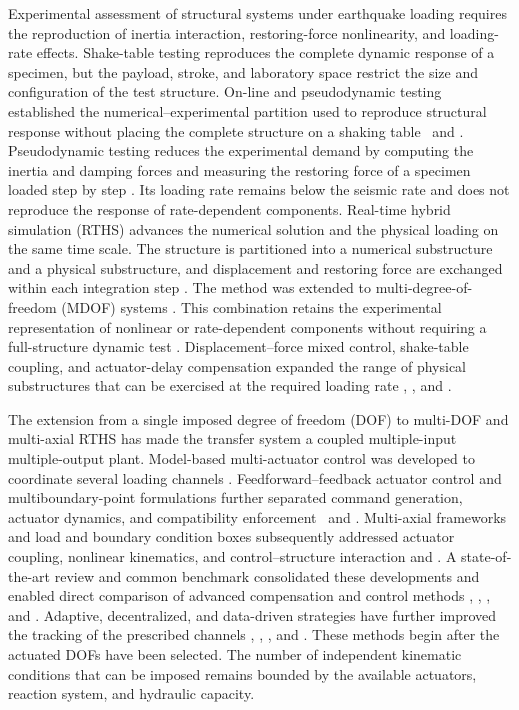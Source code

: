 \documentclass[a4paper,fleqn,review,12pt]{cas-sc}
\numberwithin{equation}{section}
\begin{document}
Experimental assessment of structural systems under earthquake loading requires the reproduction of inertia interaction, restoring-force nonlinearity, and loading-rate effects. Shake-table testing reproduces the complete dynamic response of a specimen, but the payload, stroke, and laboratory space restrict the size and configuration of the test structure. On-line and pseudodynamic testing established the numerical--experimental partition used to reproduce structural response without placing the complete structure on a shaking table \cite{Takanashi1987}\ and \cite{Mahin1989}. Pseudodynamic testing reduces the experimental demand by computing the inertia and damping forces and measuring the restoring force of a specimen loaded step by step \cite{Mahin1989}. Its loading rate remains below the seismic rate and does not reproduce the response of rate-dependent components. Real-time hybrid simulation (RTHS) advances the numerical solution and the physical loading on the same time scale. The structure is partitioned into a numerical substructure and a physical substructure, and displacement and restoring force are exchanged within each integration step \cite{Nakashima1992}. The method was extended to multi-degree-of-freedom (MDOF) systems \cite{NakashimaMasaoka1999}. This combination retains the experimental representation of nonlinear or rate-dependent components without requiring a full-structure dynamic test \cite{Gao2013}. Displacement--force mixed control, shake-table coupling, and actuator-delay compensation expanded the range of physical substructures that can be exercised at the required loading rate \cite{Pan2005}, \cite{Shao2011}, and \cite{Horiuchi1999}.

The extension from a single imposed degree of freedom (DOF) to multi-DOF and multi-axial RTHS has made the transfer system a coupled multiple-input multiple-output plant. Model-based multi-actuator control was developed to coordinate several loading channels \cite{Phillips2013}. Feedforward--feedback actuator control and multiboundary-point formulations further separated command generation, actuator dynamics, and compatibility enforcement \cite{Phillips2013Feedforward}\ and \cite{NajafiSpencer2021}. Multi-axial frameworks and load and boundary condition boxes subsequently addressed actuator coupling, nonlinear kinematics, and control--structure interaction \cite{Fermandois2017} and \cite{Najafi2020}. A state-of-the-art review and common benchmark consolidated these developments and enabled direct comparison of advanced compensation and control methods \cite{Najafi2023}, \cite{PalacioBetancur2023}, \cite{Silva2020}, and \cite{Condori2023}. Adaptive, decentralized, and data-driven strategies have further improved the tracking of the prescribed channels \cite{Quiroz2024}, \cite{RuizSong2024}, \cite{Xu2024}, and \cite{Shangguan2024}. These methods begin after the actuated DOFs have been selected. The number of independent kinematic conditions that can be imposed remains bounded by the available actuators, reaction system, and hydraulic capacity.
\end{document}
